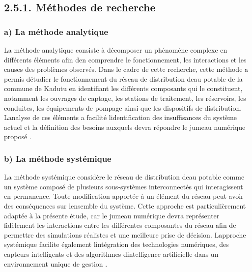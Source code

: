 \documentclass[12pt,a4paper,oneside]{report}
\begin{document}
\subsection{\texorpdfstring{\textbf{2.5.1. Méthodes de
recherche}}{2.5.1. Méthodes de recherche}}\label{muxe9thodes-de-recherche}

\subsubsection{a) La méthode
analytique}\label{a-la-muxe9thode-analytique}

La méthode analytique consiste à décomposer un phénomène complexe en
différents éléments afin d\textquotesingle en comprendre le
fonctionnement, les interactions et les causes des problèmes observés.
Dans le cadre de cette recherche, cette méthode a permis
d\textquotesingle étudier le fonctionnement du réseau de distribution
d\textquotesingle eau potable de la commune de Kadutu en identifiant les
différents composants qui le constituent, notamment les ouvrages de
captage, les stations de traitement, les réservoirs, les conduites, les
équipements de pompage ainsi que les dispositifs de distribution.
L\textquotesingle analyse de ces éléments a facilité
l\textquotesingle identification des insuffisances du système actuel et
la définition des besoins auxquels devra répondre le jumeau numérique
proposé \cite{ref108}.

\subsubsection{b) La méthode
systémique}\label{b-la-muxe9thode-systuxe9mique}

La méthode systémique considère le réseau de distribution
d\textquotesingle eau potable comme un système composé de plusieurs
sous-systèmes interconnectés qui interagissent en permanence. Toute
modification apportée à un élément du réseau peut avoir des conséquences
sur l\textquotesingle ensemble du système. Cette approche est
particulièrement adaptée à la présente étude, car le jumeau numérique
devra représenter fidèlement les interactions entre les différentes
composantes du réseau afin de permettre des simulations réalistes et une
meilleure prise de décision. L\textquotesingle approche systémique
facilite également l\textquotesingle intégration des technologies
numériques, des capteurs intelligents et des algorithmes
d\textquotesingle intelligence artificielle dans un environnement unique
de gestion \cite{ref109}.
\end{document}
